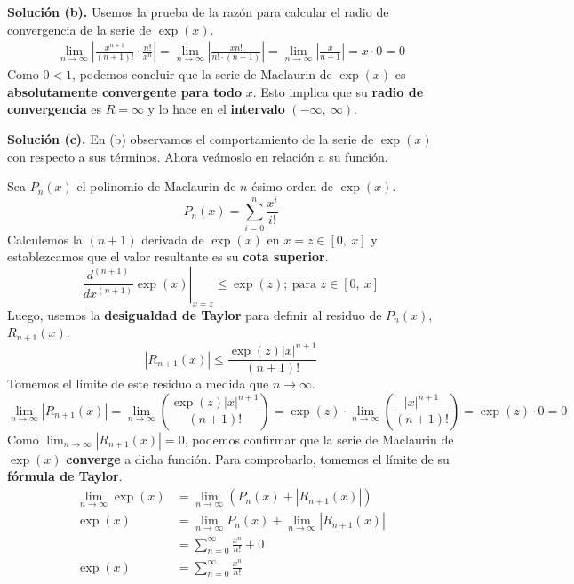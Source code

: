 \documentclass[12pt]{article}
\begin{document}
\textbf{Solución (b).} Usemos la prueba de la razón para calcular el radio de convergencia de la serie de $\exp(x)$.
\begin{align*}
\lim_{n \to \infty} \left|\frac{x^{n + 1}}{(n + 1)!} \cdot \frac{n!}{x^{n}}\right| =
\lim_{n \to \infty} \left|\frac{xn!}{n! \cdot (n + 1)}\right| =
\lim_{n \to \infty} \left|\frac{x}{n + 1}\right| = x \cdot 0 = 0
\end{align*}
Como $0 < 1$, podemos concluir que la serie de Maclaurin de $\exp(x)$ es \textbf{absolutamente convergente para todo} $x$. Esto implica que su \textbf{radio de convergencia} es $R = \infty$ y lo hace en el \textbf{intervalo} $(-\infty, \ \infty)$.

\textbf{Solución (c).} En (b) observamos el comportamiento de la serie de $\exp(x)$ con respecto a sus términos. Ahora veámoslo en relación a su función.

Sea $P_{n}(x)$ el polinomio de Maclaurin de $n$-ésimo orden de $\exp(x)$.
\[
  P_{n}(x) = \sum_{i = 0}^{n} \frac{x^{i}}{i!}
\]
Calculemos la $(n + 1)$ derivada de $\exp(x)$ en $x = z \in [0, \ x]$ y establezcamos que el valor resultante es su \textbf{cota superior}.
\[
  \left.\frac{d^{(n + 1)}}{dx^{(n + 1)}} \exp(x) \right|_{x = z} \leq \exp(z); \ \text{para } z \in [0, \ x]
\]
Luego, usemos la \textbf{desigualdad de Taylor} para definir al residuo de $P_{n}(x)$, $R_{n + 1}(x)$.
\[
  |R_{n + 1}(x)| \leq \frac{\exp(z) |x|^{n + 1}}{(n + 1)!}
\]
Tomemos el límite de este residuo a medida que $n \to \infty$.
\[
  \lim_{n \to \infty} |R_{n + 1}(x)| = \lim_{n \to \infty} \left(\frac{\exp(z) |x|^{n + 1}}{(n + 1)!}\right)
                                     = \exp(z) \cdot \lim_{n \to \infty} \left(\frac{|x|^{n + 1}}{(n + 1)!}\right)
                                     = \exp(z) \cdot 0
                                     = 0
\]
Como $\lim_{n \to \infty} |R_{n + 1}(x)| = 0$, podemos confirmar que la serie de Maclaurin de $\exp(x)$ \textbf{converge} a dicha función. Para comprobarlo, tomemos el límite de su \textbf{fórmula de Taylor}.
\begin{align*}
  \lim_{n \to \infty} \exp(x) &= \lim_{n \to \infty} (P_{n}(x) + |R_{n + 1}(x)|) \\
                      \exp(x) &= \lim_{n \to \infty} P_{n}(x) + \lim_{n \to \infty} |R_{n + 1}(x)| \\
                              &= \sum_{n = 0}^{\infty} \frac{x^{n}}{n!} + 0 \\
                      \exp(x) &= \sum_{n = 0}^{\infty} \frac{x^{n}}{n!}
\end{align*}
\end{document}
